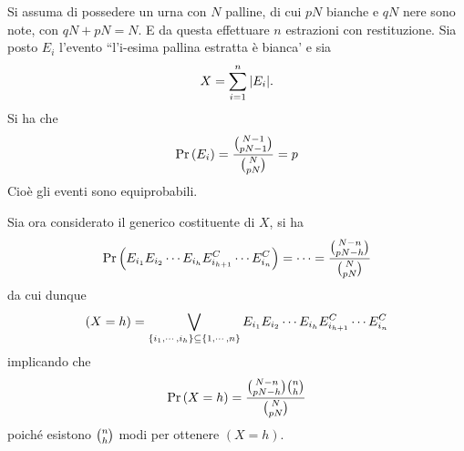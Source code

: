 \documentclass{subfiles}
\begin{document}
Si assuma di possedere un urna con \(N\) palline, di cui \(pN\) bianche e \(qN\) nere sono note, con \(qN + pN = N\).
E da questa effettuare \(n\) estrazioni con restituzione.
Sia posto \(E_{i}\) l'evento ``l'i-esima pallina estratta è bianca' e sia
\[
    X = \Sum{\Abs{E_{i}}}{i = 1}[n].
\]
Si ha che
\[
    \Prob{E_i} = \Frac{\binom{N - 1}{pN - 1}}{\binom{N}{pN}} = p
\]
Cioè gli eventi sono equiprobabili.

Sia ora considerato il generico costituente di \(X\), si ha
\[
    \Prob{E_{i_{1}}E_{i_{2}} \cdots E_{i_{h}}E^{C}_{i_{h + 1}} \cdots E^{C}_{i_{n}}} = \cdots = \Frac{\binom{N - n}{pN - h}}{\binom{N}{pN}}
\]
da cui dunque
\[
    (X = h) = \Bigvee{E_{i_{1}}E_{i_{2}} \cdots E_{i_{h}}E^{C}_{i_{h + 1}} \cdots E^{C}_{i_{n}}}{\Set{i_{1}, \cdots, i_{h}} \subseteq \Set{1, \cdots, n}}
\]
implicando che
\[
    \Prob{X = h} = \Frac{\binom{N - n}{pN - h} \binom{n}{h}}{\binom{N}{pN}}
\]
poiché esistono \(\tbinom{n}{h}\) modi per ottenere \((X = h)\).
\end{document}
